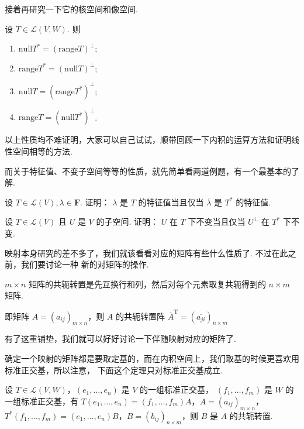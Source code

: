 接着再研究一下它的核空间和像空间. 

设 $ T \in \mathcal{L}(V, W) $. 则

\begin{enumerate}
    \item $ \mathrm{null} T^* = (\mathrm{range} T)^{\perp } $;
    
    \item $ \mathrm{range} T^* = (\mathrm{null} T)^{\perp } $;
    
    \item $ \mathrm{null} T = (\mathrm{range} T^*)^{\perp } $;
    
    \item $ \mathrm{range} T = (\mathrm{null} T^*)^{\perp } $. 
\end{enumerate}

以上性质均不难证明，大家可以自己试试，顺带回顾一下内积的运算方法和证明线性空间相等的方法. 

而关于特征值、不变子空间等等的性质，就先简单看两道例题，有一个最基本的了解. 

\begin{example}
    设 $ T \in \mathcal{L}(V), \lambda \in \mathbf{F} $. 证明：
    $ \lambda $ 是 $ T $ 的特征值当且仅当 $ \overline{\lambda} $
    是 $ T^* $ 的特征值. 
\end{example}

\begin{example}
    设 $ T \in \mathcal{L}(V) $ 且 $ U $ 是 $ V $ 的子空间. 证明：
    $ U $ 在 $ T $ 下不变当且仅当 $ U^{\perp} $ 在 $ T^* $ 下不变. 
\end{example}

映射本身研究的差不多了，我们就该看看对应的矩阵有些什么性质了. 不过在此之前，我们要讨论一种
新的对矩阵的操作. 

\begin{definition} 
    $ m \times n $ 矩阵的共轭转置是先互换行和列，然后对每个元素取复共轭得到的 $ n \times m $ 矩阵. 

    即矩阵 $ A = (a_{ij})_{m \times n} $，则 $ A $ 的共轭转置阵 $ \overline{A}^{\mathrm{T}} = (\overline{a_{ji}})_{n \times m} $
\end{definition}


有了这重铺垫，我们就可以好好讨论一下伴随映射对应的矩阵了. 

确定一个映射的矩阵都是要取定基的，而在内积空间上，我们取基的时候更喜欢用标准正交基，所以注意，
下面这个定理只对标准正交基成立. 

\begin{theorem}
    设 $ T \in \mathcal{L}(V, W) $，$ (e_1, \ldots , e_n) $ 是 $ V $ 的一组标准正交基，
    $ (f_1, \ldots , f_m) $ 是 $ W $ 的一组标准正交基，有 $ T(e_1, \ldots , e_n) = (f_1, \ldots , f_m)A $，$ A = (a_{ij})_{m \times n} $，
    $ T^*(f_1, \ldots , f_m) =(e_1, \ldots , e_n)B $，$ B = (b_{ij})_{n \times m} $，则 $ B $ 是 $ A $ 的共轭转置. 
\end{theorem}

